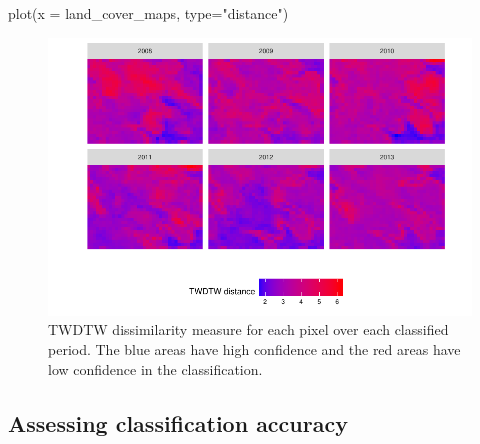 \documentclass[article,shortnames]{jss}
\begin{document}
\begin{CodeChunk}
\begin{CodeInput}
plot(x = land_cover_maps, type="distance")
\end{CodeInput}
\begin{figure}[!ht]

{\centering \includegraphics{applying_twdtw_files/figure-latex/plot-dissmilarity-1} 

}

\caption[TWDTW dissimilarity measure for each pixel over each classified period]{TWDTW dissimilarity measure for each pixel over each classified period. The blue areas have high confidence and the red areas have low confidence in the classification.}\label{fig:plot-dissmilarity}
\end{figure}
\end{CodeChunk}

\subsection{Assessing classification
accuracy}\label{assessing-classification-accuracy}
\end{document}
